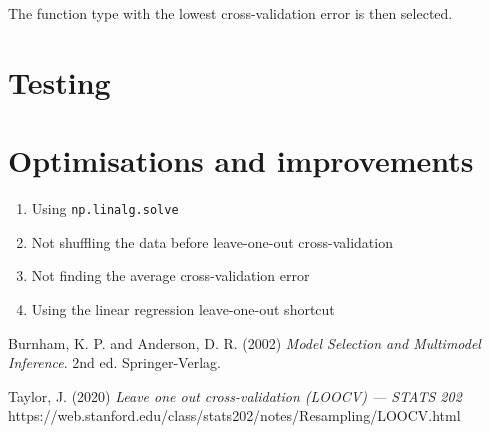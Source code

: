 \documentclass[onecolumn, 12t, a4paper]{article}
\begin{document}
The function type with the lowest cross-validation error is then selected.

\section{Testing}

\section{Optimisations and improvements}

\begin{enumerate}
    \item{Using \texttt{np.linalg.solve}}
    \item{Not shuffling the data before leave-one-out cross-validation}
    \item{Not finding the average cross-validation error}
    \item{Using the linear regression leave-one-out shortcut}
\end{enumerate}

\begin{thebibliography}{9}

    Burnham, K. P. and Anderson, D. R. (2002)
    \textit{Model Selection and Multimodel Inference}.
    2nd ed. Springer-Verlag.

    Taylor, J. (2020)
    \textit{Leave one out cross-validation (LOOCV) --- STATS 202}
    https://web.stanford.edu/class/stats202/notes/Resampling/LOOCV.html

\end{thebibliography}
    
\end{document}
